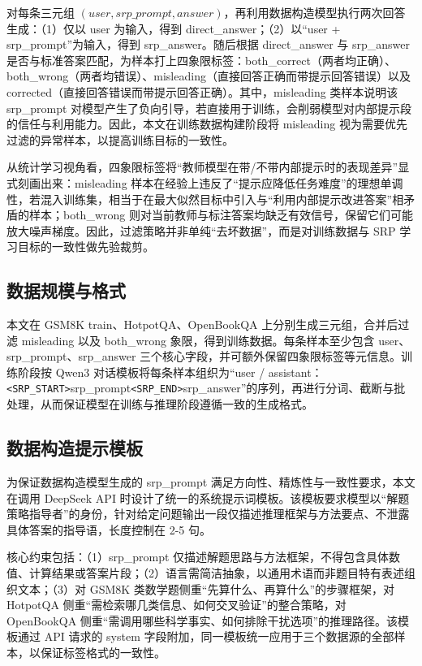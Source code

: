 对每条三元组 $(user,srp\_prompt,answer)$，再利用数据构造模型执行两次回答生成：（1）仅以 user 为输入，得到 direct\_answer；（2）以“user + srp\_prompt”为输入，得到 srp\_answer。随后根据 direct\_answer 与 srp\_answer 是否与标准答案匹配，为样本打上四象限标签：both\_correct（两者均正确）、both\_wrong（两者均错误）、misleading（直接回答正确而带提示回答错误）以及 corrected（直接回答错误而带提示回答正确）。其中，misleading 类样本说明该 srp\_prompt 对模型产生了负向引导，若直接用于训练，会削弱模型对内部提示段的信任与利用能力。因此，本文在训练数据构建阶段将 misleading 视为需要优先过滤的异常样本，以提高训练目标的一致性。

从统计学习视角看，四象限标签将“教师模型在带/不带内部提示时的表现差异”显式刻画出来：misleading 样本在经验上违反了“提示应降低任务难度”的理想单调性，若混入训练集，相当于在最大似然目标中引入与“利用内部提示改进答案”相矛盾的样本；both\_wrong 则对当前教师与标注答案均缺乏有效信号，保留它们可能放大噪声梯度。因此，过滤策略并非单纯“去坏数据”，而是对训练数据与 SRP 学习目标的一致性做先验裁剪。

\subsection{数据规模与格式}

本文在 GSM8K train、HotpotQA、OpenBookQA 上分别生成三元组，合并后过滤 misleading 以及 both\_wrong 象限，得到训练数据。每条样本至少包含 user、srp\_prompt、srp\_answer 三个核心字段，并可额外保留四象限标签等元信息。训练阶段按 Qwen3 对话模板将每条样本组织为“user / assistant：\texttt{<SRP\_START>}srp\_prompt\texttt{<SRP\_END>}srp\_answer”的序列，再进行分词、截断与批处理，从而保证模型在训练与推理阶段遵循一致的生成格式。

\subsection{数据构造提示模板}

为保证数据构造模型生成的 srp\_prompt 满足方向性、精炼性与一致性要求，本文在调用 DeepSeek API 时设计了统一的系统提示词模板。该模板要求模型以“解题策略指导者”的身份，针对给定问题输出一段仅描述推理框架与方法要点、不泄露具体答案的指导语，长度控制在 2-5 句。

核心约束包括：（1）srp\_prompt 仅描述解题思路与方法框架，不得包含具体数值、计算结果或答案片段；（2）语言需简洁抽象，以通用术语而非题目特有表述组织文本；（3）对 GSM8K 类数学题侧重“先算什么、再算什么”的步骤框架，对 HotpotQA 侧重“需检索哪几类信息、如何交叉验证”的整合策略，对 OpenBookQA 侧重“需调用哪些科学事实、如何排除干扰选项”的推理路径。该模板通过 API 请求的 system 字段附加，同一模板统一应用于三个数据源的全部样本，以保证标签格式的一致性。

